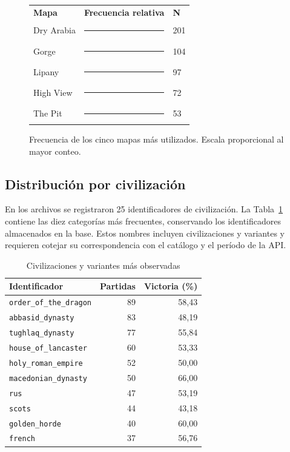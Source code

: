 \documentclass[12pt,a4paper]{article}
\begin{document}
\begin{figure}[htbp]
\centering
\begin{tabular}{@{}lcl@{}}
\textbf{Mapa} & \textbf{Frecuencia relativa} & \textbf{N}\\[0.15cm]
Dry Arabia & \rule{6.0cm}{0.25cm} & 201\\[0.15cm]
Gorge & \rule{3.10cm}{0.25cm} & 104\\[0.15cm]
Lipany & \rule{2.90cm}{0.25cm} & 97\\[0.15cm]
High View & \rule{2.15cm}{0.25cm} & 72\\[0.15cm]
The Pit & \rule{1.58cm}{0.25cm} & 53
\end{tabular}
\caption{Frecuencia de los cinco mapas más utilizados. Escala proporcional al mayor conteo.}
\label{fig:mapas}
\end{figure}

\subsection{Distribución por civilización}

En los archivos se registraron 25 identificadores de civilización. La Tabla~\ref{tab:civs} contiene las diez categorías más frecuentes, conservando los identificadores almacenados en la base. Estos nombres incluyen civilizaciones y variantes y requieren cotejar su correspondencia con el catálogo y el período de la API.

\begin{table}[htbp]
\centering\footnotesize
\caption{Civilizaciones y variantes más observadas}
\label{tab:civs}
\begin{tabular}{lrr}
\toprule
\textbf{Identificador} & \textbf{Partidas} & \textbf{Victoria (\%)}\\
\midrule
\texttt{order\_of\_the\_dragon} & 89 & 58,43\\
\texttt{abbasid\_dynasty} & 83 & 48,19\\
\texttt{tughlaq\_dynasty} & 77 & 55,84\\
\texttt{house\_of\_lancaster} & 60 & 53,33\\
\texttt{holy\_roman\_empire} & 52 & 50,00\\
\texttt{macedonian\_dynasty} & 50 & 66,00\\
\texttt{rus} & 47 & 53,19\\
\texttt{scots} & 44 & 43,18\\
\texttt{golden\_horde} & 40 & 60,00\\
\texttt{french} & 37 & 56,76\\
\bottomrule
\end{tabular}
\end{table}
\end{document}
